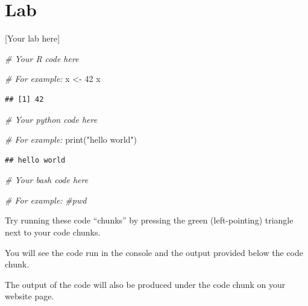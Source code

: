 \documentclass[
]{book}
\newenvironment{Shaded}{\begin{snugshade}}{\end{snugshade}}
\newcommand{\BuiltInTok}[1]{#1}
\newcommand{\CommentTok}[1]{\textcolor[rgb]{0.56,0.35,0.01}{\textit{#1}}}
\newcommand{\DecValTok}[1]{\textcolor[rgb]{0.00,0.00,0.81}{#1}}
\newcommand{\NormalTok}[1]{#1}
\newcommand{\OtherTok}[1]{\textcolor[rgb]{0.56,0.35,0.01}{#1}}
\newcommand{\StringTok}[1]{\textcolor[rgb]{0.31,0.60,0.02}{#1}}
\begin{document}
\section{Lab}\label{lab}

{[}Your lab here{]}

\begin{Shaded}
\begin{Highlighting}[]
\CommentTok{\# Your R code here}

\CommentTok{\# For example:}
\NormalTok{x }\OtherTok{\textless{}{-}} \DecValTok{42}
\NormalTok{x}
\end{Highlighting}
\end{Shaded}

\begin{verbatim}
## [1] 42
\end{verbatim}

\begin{Shaded}
\begin{Highlighting}[]
\CommentTok{\# Your python code here}

\CommentTok{\# For example:}
\BuiltInTok{print}\NormalTok{(}\StringTok{"hello world"}\NormalTok{)}
\end{Highlighting}
\end{Shaded}

\begin{verbatim}
## hello world
\end{verbatim}

\begin{Shaded}
\begin{Highlighting}[]
\CommentTok{\# Your bash code here}

\CommentTok{\# For example:}
\CommentTok{\#pwd}
\end{Highlighting}
\end{Shaded}

Try running these code ``chunks'' by pressing the green (left-pointing) triangle next to your code chunks.

You will see the code run in the console and the output provided below the code chunk.

The output of the code will also be produced under the code chunk on your website page.

  
\end{document}
